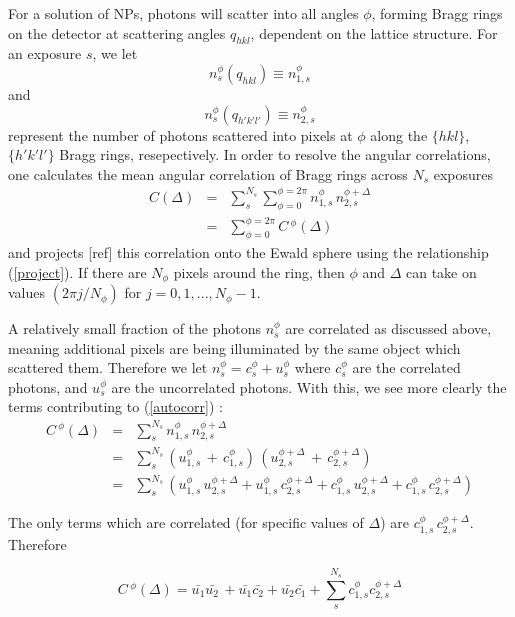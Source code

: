 \documentclass [11pt,fleqn]{article}
\def \be {\begin{equation}}
\def \ee {\end{equation}}
\def \beq {\begin{eqnarray}}
\def \eeq {\end{eqnarray}}
\begin{document}
For a solution of NPs, photons will scatter into all angles $\phi$, forming Bragg rings on the detector at scattering angles $q_{hkl}$, dependent on the lattice structure. For an exposure $s$, we let
\be
n_s^\phi (q_{hkl}) \equiv n_{1,s}^\phi
\ee
and 
\be
n_s^\phi (q_{h'k'l'}) \equiv n_{2,s}^\phi
\ee
represent the number of photons scattered into pixels at $\phi$ along the $\{hkl\}$, $\{h'k'l'\}$ Bragg rings, resepectively. In order to resolve the angular correlations, one calculates the mean angular correlation of Bragg rings across $N_s$ exposures
\beq \label{autocorr}
C( \Delta) &=& \sum _s ^ {N_s} \sum_{\phi=0}^{\phi=2\pi} n_{1,s}^\phi\, n_{2,s}^{\phi + \Delta} \\
&=& \sum_{\phi=0}^{\phi=2\pi} C\,^\phi(\Delta) 
\eeq
and projects [ref] this correlation onto the Ewald sphere using the relationship (\ref{project}). If there are $N_\phi$ pixels around the ring, then $\phi$ and $\Delta$ can take on values $(2\pi j/N_\phi)$ for $j = 0,1,. . . ,N_\phi-1$. 

A relatively small fraction of the photons $n_s^\phi$ are correlated as discussed above, meaning additional pixels are being illuminated by the same object which scattered them. Therefore we let $n_s^\phi = c_s^\phi + u_s^\phi$ where $c_s^\phi$ are the correlated photons, and $u_s^\phi$ are the uncorrelated photons. With this, we see more clearly the terms contributing to  (\ref{autocorr}) :
\beq
C\,^\phi(\Delta) &=& \sum_s^{N_s} n_{1,s}^\phi\, n_{2,s}^{\phi + \Delta} \\
&=& \sum_s^{N_s} \left( u_{1,s}^\phi\,+\,c_{1,s}^ \phi \right)\,\left( u_{2,s}^{ \phi+\Delta} \,+\, c_{2,s}^{\phi+\Delta} \right ) \\
&=& \sum_s^{N_s} \left( u_{1,s}^\phi\, u_{2,s}^{\phi+\Delta} + u_{1,s}^\phi\, c_{2,s}^{\phi+\Delta} + c_{1,s}^\phi\, u_{2,s}^{\phi+\Delta}  +  c_{1,s}^\phi\, c_{2,s}^{\phi+\Delta} \right )
\eeq

The only terms which are correlated (for specific values of $\Delta$) are $c_{1,s}^\phi\,c_{2,s}^{\phi+\Delta}$. Therefore

\be \label{cphi2}
C\,^\phi(\Delta) = \bar{u_1} \bar{u_2}\, + \bar{u_1}\bar{c_2}  + \bar{u_2}\bar{c_1} + \sum_s^{N_s}c_{1,s}^\phi c_{2,s}^{\phi + \Delta} 
\ee
\end{document}
